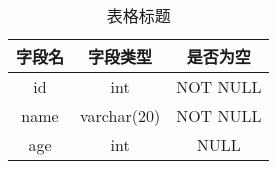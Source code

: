 \xiaosi 
\lipsum[1]

\wuhao
\begin{table}[H]
  \centering
  \caption{表格标题}
  \label{tab:my-table}
  \begin{tabular}{|c|c|c|}
    \hline
    字段名 & 字段类型 & 是否为空 \\
    \hline
    id & int & NOT NULL \\
    \hline
    name & varchar(20) & NOT NULL \\
    \hline
    age & int & NULL \\
    \hline
  \end{tabular}
\end{table}







\lipsum[1]